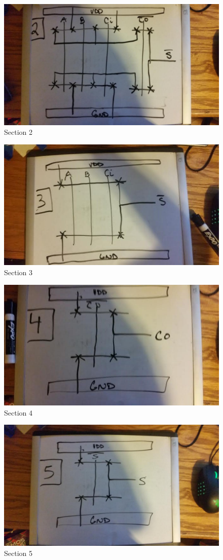 \documentclass[12pt]{article}
\begin{document}
\begin{figure}[H]
\centering
\includegraphics[width=0.7\linewidth]{pre-2}
\caption{Section 2}
\label{fig:pre-2}
\end{figure}

\begin{figure}[H]
\centering
\includegraphics[width=0.7\linewidth]{pre-3}
\caption{Section 3}
\label{fig:pre-3}
\end{figure}


\begin{figure}[H]
\centering
\includegraphics[width=0.7\linewidth]{pre-4}
\caption{Section 4}
\label{fig:pre-4}
\end{figure}

\begin{figure}
\centering
\includegraphics[width=0.7\linewidth]{pre-5}
\caption{Section 5}
\label{fig:pre-5}
\end{figure}
\end{document}
